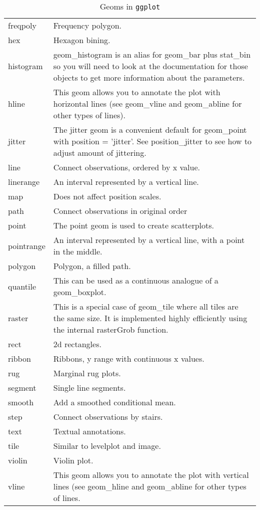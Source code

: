 \begin{table}[ht]
\begin{tabular}{ll}
  freqpoly & Frequency polygon. \\ 
  hex & Hexagon bining. \\ 
  histogram & geom\_histogram is an alias for geom\_bar plus stat\_bin so you will need to look at the documentation for those objects to get more information about the parameters. \\ 
  hline & This geom allows you to annotate the plot with horizontal lines (see geom\_vline and geom\_abline for other types of lines). \\ 
  jitter & The jitter geom is a convenient default for geom\_point with position = 'jitter'. See position\_jitter to see how to adjust amount of jittering. \\ 
  line & Connect observations, ordered by x value. \\ 
  linerange & An interval represented by a vertical line. \\ 
  map & Does not affect position scales. \\ 
  path & Connect observations in original order \\ 
  point & The point geom is used to create scatterplots. \\ 
  pointrange & An interval represented by a vertical line, with a point in the middle. \\ 
  polygon & Polygon, a filled path. \\ 
  quantile & This can be used as a continuous analogue of a geom\_boxplot. \\ 
  raster & This is a special case of geom\_tile where all tiles are the same size. It is implemented highly efficiently using the internal rasterGrob function. \\ 
  rect & 2d rectangles. \\ 
  ribbon & Ribbons, y range with continuous x values. \\ 
  rug & Marginal rug plots. \\ 
  segment & Single line segments. \\ 
  smooth & Add a smoothed conditional mean. \\ 
  step & Connect observations by stairs. \\ 
  text & Textual annotations. \\ 
  tile & Similar to levelplot and image. \\ 
  violin & Violin plot. \\ 
  vline & This geom allows you to annotate the plot with vertical lines (see geom\_hline and geom\_abline for other types of lines. \\ 
   \hline
\end{tabular}
\caption{Geoms in \texttt{ggplot}} 
\label{geoms}
\end{table}
